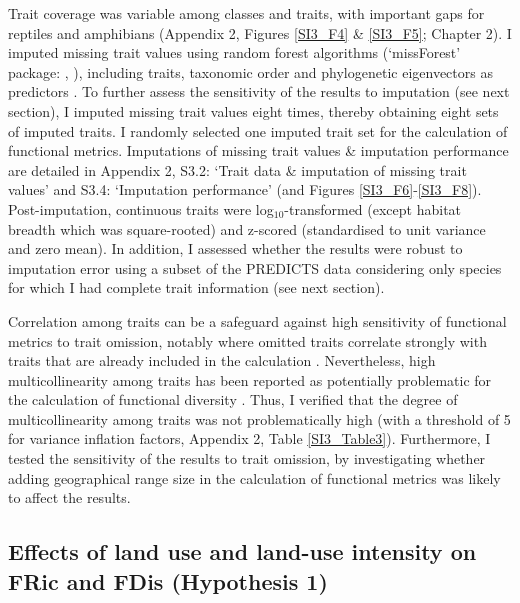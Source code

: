 Trait coverage was variable among classes and traits, with important gaps for reptiles and amphibians (Appendix 2, Figures \ref{SI3_F4} \& \ref{SI3_F5}; Chapter 2). I imputed missing trait values using random forest algorithms (`missForest' package: \citet{Stekhoven2012}, \citet{Stekhoven2016}), including traits, taxonomic order and phylogenetic eigenvectors as predictors \citep{Debastiani2021, Penone2014}. To further assess the sensitivity of the results to imputation (see next section), I imputed missing trait values eight times, thereby obtaining eight sets of imputed traits. I randomly selected one imputed trait set for the calculation of functional metrics. Imputations of missing trait values \& imputation performance are detailed in Appendix 2, S3.2: `Trait data \& imputation of missing trait values' and S3.4: `Imputation performance' (and Figures \ref{SI3_F6}-\ref{SI3_F8}). Post-imputation, continuous traits were log$_{10}$-transformed (except habitat breadth which was square-rooted) and z-scored (standardised to unit variance and zero mean). In addition, I assessed whether the results were robust to imputation error using a subset of the PREDICTS data considering only species for which I had complete trait information (see next section).

Correlation among traits can be a safeguard against high sensitivity of functional metrics to trait omission, notably where omitted traits correlate strongly with traits that are already included in the calculation \citep{Mouillot2021}. Nevertheless, high multicollinearity among traits has been reported as potentially problematic for the calculation of functional diversity \citep{Cadotte2011}. Thus, I verified that the degree of multicollinearity among traits was not problematically high (with a threshold of 5 for variance inflation factors, Appendix 2, Table \ref{SI3_Table3}). Furthermore, I tested the sensitivity of the results to trait omission, by investigating whether adding geographical range size in the calculation of functional metrics was likely to affect the results.


\subsection{Effects of land use and land-use intensity on FRic and FDis (Hypothesis 1)}


